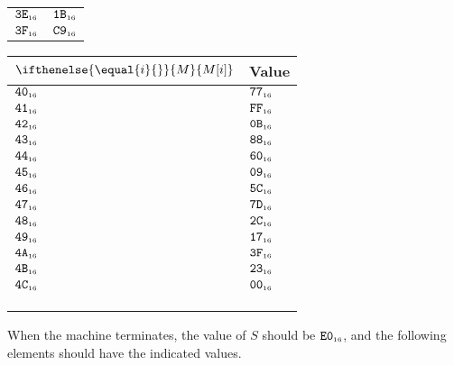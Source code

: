 \documentclass[a4paper,12pt]{article}
\newcommand{\num}[1]{\texttt{#1}}
\newcommand{\hex}[1]{\num{#1}_{\textup{\tiny 16}}}
\newcommand{\MEM}[1]{\ifthenelse{\equal{#1}{}}{M}{M[#1]}}
\newcommand{\SP}{S}
\begin{document}
\begin{center}
\begin{tabular}{@{}ll@{}}
    $\hex{3E}$ & $\hex{1B}$ \\
    $\hex{3F}$ & $\hex{C9}$ \\
    \hline
  \end{tabular}
  \hfil
  \begin{tabular}{@{}ll@{}}
    \hline
    $\MEM{i}$  & Value \\
    \hline
    $\hex{40}$ & $\hex{77}$ \\
    $\hex{41}$ & $\hex{FF}$ \\
    $\hex{42}$ & $\hex{0B}$ \\
    $\hex{43}$ & $\hex{88}$ \\
    $\hex{44}$ & $\hex{60}$ \\
    $\hex{45}$ & $\hex{09}$ \\
    $\hex{46}$ & $\hex{5C}$ \\
    $\hex{47}$ & $\hex{7D}$ \\
    $\hex{48}$ & $\hex{2C}$ \\
    $\hex{49}$ & $\hex{17}$ \\
    $\hex{4A}$ & $\hex{3F}$ \\
    $\hex{4B}$ & $\hex{23}$ \\
    $\hex{4C}$ & $\hex{00}$ \\
    \\
    \\
    \\
    \hline
  \end{tabular}
\end{center}

When the machine terminates, the value of $\SP$ should be $\hex{E0}$, and the following elements should have the indicated values.
\end{document}
